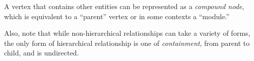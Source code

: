 \documentclass{egpubl}
\begin{document}
A vertex that contains other entities can be represented as a \textit{compound node}, which is equivalent to a ``parent'' vertex or in some contexts a ``module.''

Also, note that while non-hierarchical relationships can take a variety of forms, the only form of hierarchical relationship is one of \textit{containment}, from parent to child, and is undirected.


%
%
%

%
%
%
\end{document}
